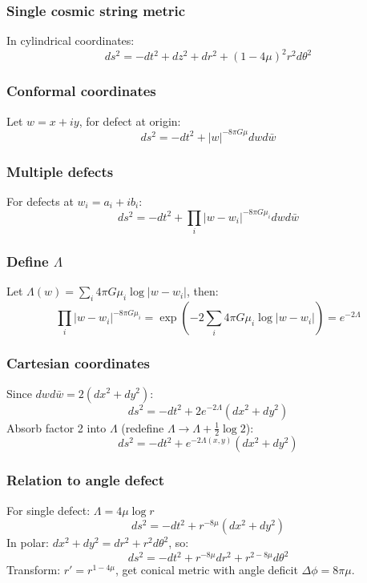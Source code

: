\documentclass[12pt]{article}
\begin{document}
\subsubsection{Single cosmic string metric}
In cylindrical coordinates:
\begin{equation}
    ds^2 = -dt^2 + dz^2 + dr^2 + (1-4\mu)^2 r^2 d\theta^2
\end{equation}

\subsubsection{Conformal coordinates}
Let $w = x + iy$, for defect at origin:
\begin{equation}
    ds^2 = -dt^2 + |w|^{-8\pi G\mu} dw d\bar{w}
\end{equation}

\subsubsection{Multiple defects}
For defects at $w_i = a_i + ib_i$:
\begin{equation}
    ds^2 = -dt^2 + \prod_i |w-w_i|^{-8\pi G\mu_i} dw d\bar{w}
\end{equation}

\subsubsection{Define $\Lambda$}
Let $\Lambda(w) = \sum_i 4\pi G\mu_i \log|w-w_i|$, then:
\begin{equation}
    \prod_i |w-w_i|^{-8\pi G\mu_i} = \exp\left(-2\sum_i 4\pi G\mu_i \log|w-w_i|\right) = e^{-2\Lambda}
\end{equation}

\subsubsection{Cartesian coordinates}
Since $dw d\bar{w} = 2(dx^2 + dy^2)$:
\begin{equation}
    ds^2 = -dt^2 + 2e^{-2\Lambda} (dx^2 + dy^2)
\end{equation}
Absorb factor 2 into $\Lambda$ (redefine $\Lambda \to \Lambda + \frac{1}{2}\log 2$):
\begin{equation}
    ds^2 = -dt^2 + e^{-2\Lambda(x,y)} (dx^2 + dy^2)
    \tag{Eq. 16}
\end{equation}

\subsubsection{Relation to angle defect}
For single defect: $\Lambda = 4\mu \log r$
\begin{equation}
    ds^2 = -dt^2 + r^{-8\mu} (dx^2 + dy^2)
\end{equation}
In polar: $dx^2 + dy^2 = dr^2 + r^2 d\theta^2$, so:
\begin{equation}
    ds^2 = -dt^2 + r^{-8\mu} dr^2 + r^{2-8\mu} d\theta^2
\end{equation}
Transform: $r' = r^{1-4\mu}$, get conical metric with angle deficit $\Delta\phi = 8\pi\mu$.
\end{document}
